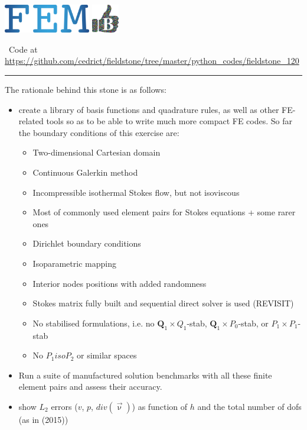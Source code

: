 \includegraphics[height=1.25cm]{images/pictograms/FEM}
\includegraphics[height=1.25cm]{images/pictograms/benchmark}

%

\begin{center}
\inpython~Code at \url{https://github.com/cedrict/fieldstone/tree/master/python_codes/fieldstone_120}
\end{center}

\par\noindent\rule{\textwidth}{0.4pt}


The rationale behind this stone is as follows:
\begin{itemize}
\item create a library of basis functions and quadrature rules, as well as 
other FE-related tools so as to be able to write much more compact FE codes. 
So far the boundary conditions of this exercise are:
\begin{itemize}
\item Two-dimensional Cartesian domain
\item Continuous Galerkin method
\item Incompressible isothermal Stokes flow, but not isoviscous
\item Most of commonly used element pairs for Stokes equations + some rarer ones 
\item Dirichlet boundary conditions 
\item Isoparametric mapping 
\item Interior nodes positions with added randomness
\item Stokes matrix fully built and sequential direct solver is used (REVISIT)
\item No stabilised formulations, i.e. no ${\bm Q}_1\times Q_1$-stab, 
      ${\bm Q}_1\times P_0$-stab, or $P_1\times P_1$-stab
\item No $P_1isoP_2$ or similar spaces
\end{itemize}
\item Run a suite of manufactured solution benchmarks with all 
these finite element pairs and assess their accuracy.
\item show $L_2$ errors ($v$, $p$, $div(\vec\upnu)$) as function of $h$ and the 
total number of dofs (as in \textcite{cakp15} (2015))
\end{itemize}

